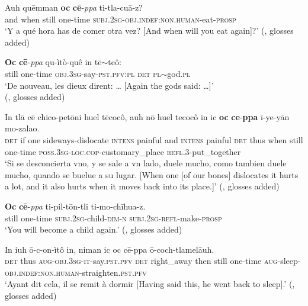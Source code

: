 \begin{exe}
	\ex \label{exAppendixClassicalNahuatlIterativeIncrement1}
	\gll Auh quēmman \textbf{oc} \textbf{cē}-\textit{ppa} ti-tla-cuā-z?\\
	and when still one-time \textsc{subj}.2\textsc{sg}-\textsc{obj}.\textsc{indef}:\textsc{non}.\textsc{human}-eat-\textsc{prosp}\\
	\glt \lq Y a qué hora has de comer otra vez? [And when will you eat again]?' (\cite[505]{Carochi1645}, glosses added)

	\ex \label{exAppendixClassicalNahuatlIterativeIncrement2}
	\gll \textbf{Oc} \textbf{cē}-\textit{ppa} qu-ìtò-quê in tē$\sim$teô:\\
	still one-time \textsc{obj}.3\textsc{sg}-say-\textsc{pst}.\textsc{pfv}:\textsc{pl} \textsc{det} \textsc{pl}$\sim$god.\textsc{pl}\\
	\glt \lq De nouveau, les dieux dirent: … [Again the gods said: …]'
	\\(\cite[1265]{Launey1986}, glosses added) 

	\ex \label{exAppendixClassicalNahuatlIterativeIncrement3}
\gll In tlā cē chico-petōni huel tēcocô, auh nō huel tecocô in ic \textbf{oc} \textbf{ce}-\textbf{ppa} ī-ye-yān mo-zalao.\\
\textsc{det} if one sideways-dislocate \textsc{intens} painful and \textsc{intens} painful \textsc{det} thus when still one-time \textsc{poss}.3\textsc{sg}-\textsc{loc}.\textsc{cop}-customary\_place \textsc{refl}.3-put\_together\\
\glt \lq Si se desconcierta vno, y se sale a vn lado, duele mucho, como tambien duele mucho, quando se buelue a su lugar. [When one [of our bones] dislocates it hurts a lot, and it also hurts when it moves back into its place.]' (\cite[498]{Carochi1645}, glosses added)

	\ex\label{exAppendixClassicalNahuatlIterativeIncrement4} 
	\gll \textbf{Oc} \textbf{cē}-\textit{ppa} ti-pil-tōn-tli ti-mo-chīhua-z.\\
	still one-time \textsc{subj}.2\textsc{sg}-child-\textsc{dim}-\textsc{n} \textsc{subj}.2\textsc{sg}-\textsc{refl}-make-\textsc{prosp}\\
	\glt \lq You will become a child again.' (\cite[537]{Andrews2003}, glosses added)

	\ex\label{exAppendixClassicalNahuatlIterativeIncrement5} 
	\gll In iuh ō-c-on-ìtô in, niman ic oc cē-ppa ō-coch-tlamelāuh.\\
	\textsc{det} thus \textsc{aug}-\textsc{obj}.3\textsc{sg}-\textsc{it}-say.\textsc{pst}.\textsc{pfv} \textsc{det} right\_away then still one-time \textsc{aug}-sleep-\textsc{obj}.\textsc{indef}:\textsc{non}.\textsc{human}-straighten.\textsc{pst}.\textsc{pfv}\\
	\glt \lq Ayant dit cela, il se remit à dormir  [Having said this, he went back to sleep].' (\cite[604]{Launey1986}, glosses added)
\end{exe}

